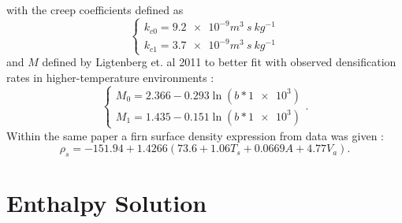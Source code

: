 \documentclass{article}%
\begin{document}
with the creep coefficients defined as
  $$
  \begin{cases}
    k_{c0} = \SI{9.2e-9} m^3\ s\ kg^{-1} \\
    k_{c1} = \SI{3.7e-9} m^3\ s\ kg^{-1}  
  \end{cases}
  $$
and $M$ defined by Ligtenberg et. al 2011 to better fit with observed densification rates in higher-temperature environments :
  $$
  \begin{cases}
    M_0 = 2.366 - 0.293\ln(b*\SI{1e3})\\
    M_1 = 1.435 - 0.151\ln(b*\SI{1e3})
  \end{cases}.
  $$
Within the same paper a firn surface density expression from data was given :
  $$ \rho_s = -151.94 + 1.4266(73.6 + 1.06T_s + 0.0669A + 4.77V_a).$$


\section{Enthalpy Solution}
\end{document}
